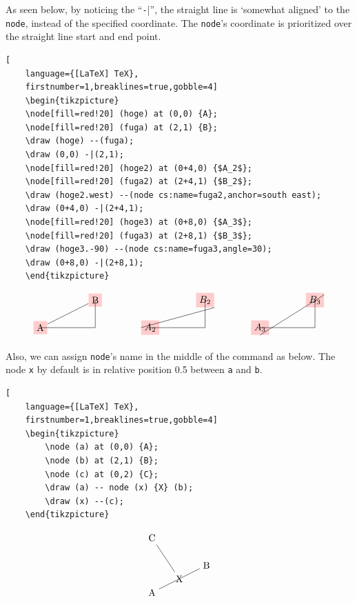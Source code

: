 \documentclass[lualatex]{jlreq}
\begin{document}
As seen below, by noticing the ``\verb|-||'', the straight line is `somewhat aligned' to the \verb|node|, instead of the specified coordinate. The \verb|node|'s coordinate is prioritized over the straight line start and end point.
\begin{lstlisting}[
    language={[LaTeX] TeX},
    firstnumber=1,breaklines=true,gobble=4]
    \begin{tikzpicture}
    \node[fill=red!20] (hoge) at (0,0) {A};
    \node[fill=red!20] (fuga) at (2,1) {B};
    \draw (hoge) --(fuga);
    \draw (0,0) -|(2,1);
    \node[fill=red!20] (hoge2) at (0+4,0) {$A_2$};
    \node[fill=red!20] (fuga2) at (2+4,1) {$B_2$};
    \draw (hoge2.west) --(node cs:name=fuga2,anchor=south east);
    \draw (0+4,0) -|(2+4,1);
    \node[fill=red!20] (hoge3) at (0+8,0) {$A_3$};
    \node[fill=red!20] (fuga3) at (2+8,1) {$B_3$};
    \draw (hoge3.-90) --(node cs:name=fuga3,angle=30);
    \draw (0+8,0) -|(2+8,1);
    \end{tikzpicture}
\end{lstlisting}
\[
    \begin{tikzpicture}
    \node[fill=red!20] (hoge) at (0,0) {A};
    \node[fill=red!20] (fuga) at (2,1) {B};
    \draw (hoge) --(fuga);
    \draw (0,0) -|(2,1);
    \node[fill=red!20] (hoge2) at (0+4,0) {$A_2$};
    \node[fill=red!20] (fuga2) at (2+4,1) {$B_2$};
    \draw (hoge2.west) --(node cs:name=fuga2,anchor=south east);
    \draw (0+4,0) -|(2+4,1);
    \node[fill=red!20] (hoge3) at (0+8,0) {$A_3$};
    \node[fill=red!20] (fuga3) at (2+8,1) {$B_3$};
    \draw (hoge3.-90) --(node cs:name=fuga3,angle=30);
    \draw (0+8,0) -|(2+8,1);
    \end{tikzpicture}
\]

Also, we can assign \verb|node|'s name in the middle of the command as below. The node \verb|x| by default is in relative position 0.5 between \verb|a| and \verb|b|.
\begin{lstlisting}[
    language={[LaTeX] TeX},
    firstnumber=1,breaklines=true,gobble=4]
    \begin{tikzpicture}
        \node (a) at (0,0) {A};
        \node (b) at (2,1) {B};
        \node (c) at (0,2) {C};
        \draw (a) -- node (x) {X} (b);
        \draw (x) --(c);
    \end{tikzpicture}
\end{lstlisting}
\[
    \begin{tikzpicture}
        \node (a) at (0,0) {A};
        \node (b) at (2,1) {B};
        \node (c) at (0,2) {C};
        \draw (a) -- node (x) {X} (b);
        \draw (x) --(c);
    \end{tikzpicture}
\]
\end{document}
